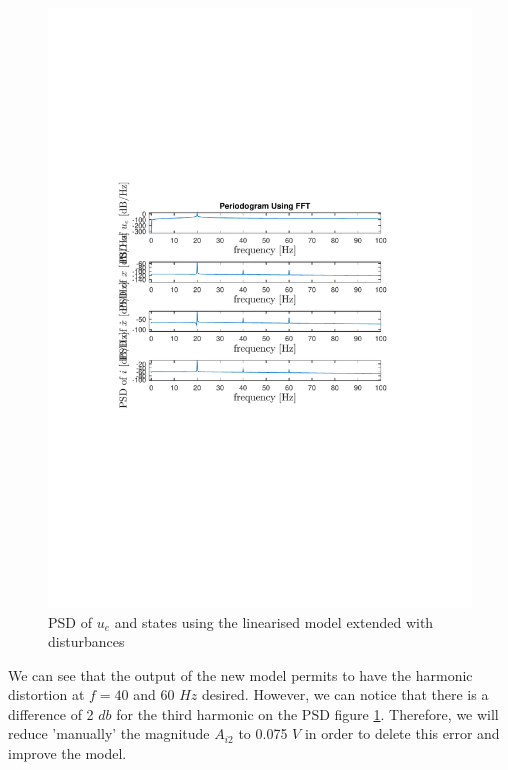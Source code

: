 \begin{figure}[H]
 \centering 
 \includegraphics[trim=2cm 7cm 2cm 7cm, clip=true, totalheight=0.35\textheight, angle=0]{figures/responseNoisef.pdf}
 \caption{PSD of $u_e$ and states using the linearised model extended with disturbances}
 \label{fig:responseNoisef}
\end{figure}

We can see that the output of the new model permits to have the harmonic distortion at $f = 40$ and $60$ $Hz$ desired. However, we can notice that there is a difference of 2 $db$ for the third harmonic on the PSD figure \ref{fig:responseNoisef}. Therefore, we will reduce 'manually' the magnitude $A_{i2}$ to 0.075 $V$ in order to delete this error and improve the model.

